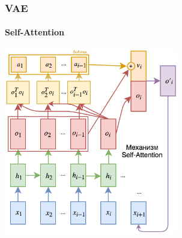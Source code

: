\documentclass[10pt]{beamer}
\begin{document}
\begin{frame}
\frametitle{VAE}
\framesubtitle{Self-Attention}

\begin{center}
    \includegraphics[width=0.57\textwidth]{images/self_attention.png}
\end{center}

\end{frame}
\end{document}
